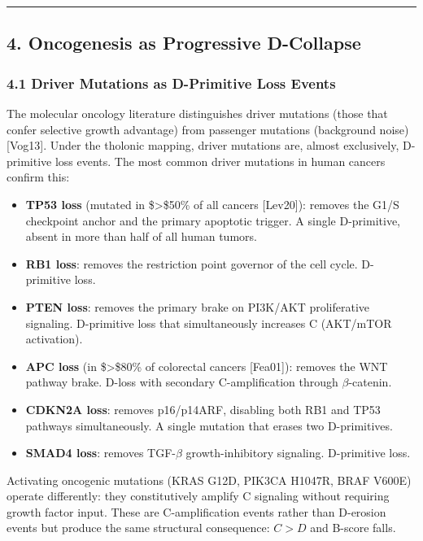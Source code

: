 \documentclass[
  11pt,
  letterpaper,
]{article}
\providecommand{\tightlist}{%
  \setlength{\itemsep}{0pt}\setlength{\parskip}{0pt}}
\begin{document}
\begin{center}\rule{0.5\linewidth}{0.5pt}\end{center}

\subsection{4. Oncogenesis as Progressive
D-Collapse}\label{oncogenesis-as-progressive-d-collapse}

\subsubsection{4.1 Driver Mutations as D-Primitive Loss
Events}\label{driver-mutations-as-d-primitive-loss-events}

The molecular oncology literature distinguishes driver mutations (those
that confer selective growth advantage) from passenger mutations
(background noise) {[}Vog13{]}. Under the tholonic mapping, driver
mutations are, almost exclusively, D-primitive loss events. The most
common driver mutations in human cancers confirm this:

\begin{itemize}
\tightlist
\item
  \textbf{TP53 loss} (mutated in \$\textgreater\$50\% of all cancers
  {[}Lev20{]}): removes the G1/S checkpoint anchor and the primary
  apoptotic trigger. A single D-primitive, absent in more than half of
  all human tumors.
\item
  \textbf{RB1 loss}: removes the restriction point governor of the cell
  cycle. D-primitive loss.
\item
  \textbf{PTEN loss}: removes the primary brake on PI3K/AKT
  proliferative signaling. D-primitive loss that simultaneously
  increases C (AKT/mTOR activation).
\item
  \textbf{APC loss} (in \$\textgreater\$80\% of colorectal cancers
  {[}Fea01{]}): removes the WNT pathway brake. D-loss with secondary
  C-amplification through \(\beta\)-catenin.
\item
  \textbf{CDKN2A loss}: removes p16/p14ARF, disabling both RB1 and TP53
  pathways simultaneously. A single mutation that erases two
  D-primitives.
\item
  \textbf{SMAD4 loss}: removes TGF-\(\beta\) growth-inhibitory
  signaling. D-primitive loss.
\end{itemize}

Activating oncogenic mutations (KRAS G12D, PIK3CA H1047R, BRAF V600E)
operate differently: they constitutively amplify C signaling without
requiring growth factor input. These are C-amplification events rather
than D-erosion events but produce the same structural consequence:
\(C > D\) and B-score falls.
\end{document}

